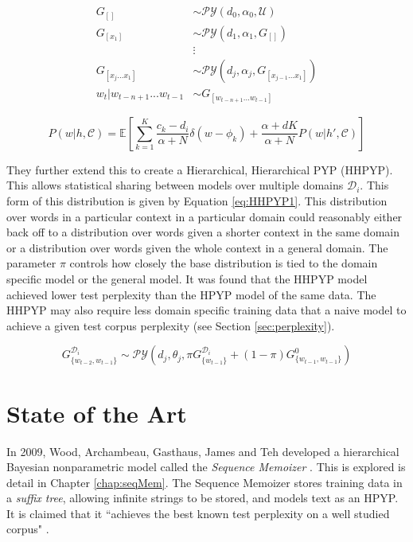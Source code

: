 \begin{align}
G_{[]}&\sim\mathcal{PY}(d_{0},\alpha_{0},\mathcal{U}) \nonumber
\\
G_{[x_{1}]}&\sim\mathcal{PY}(d_{1},\alpha_{1},G_{[]}) \nonumber
\\
&\vdots\nonumber 
\\
G_{[x_{j}...x_{1}]}&\sim\mathcal{PY}(d_{j},\alpha_{j},G_{[x_{j-1}...x_{1}]}) \nonumber
\\
w_{t}|w_{t-n+1}...w_{t-1}&\sim G_{[w_{t-n+1}...w_{t-1}]} 
\label{eq:HNBASLMDA1}
\end{align}


\begin{equation}
P(w|h,\mathcal{C})=\mathbb{E}\left[\sum_{k=1}^{K}\frac{c_{k}-d_{i}}{\alpha+N}\delta(w-\phi_{k})+\frac{\alpha+dK}{\alpha+N}P(w|h',\mathcal{C})\right]
\label{eq:HBNASLMDA2.1posterior}
\end{equation}

They further extend this to create a Hierarchical, Hierarchical PYP (HHPYP). This allows statistical sharing between models over multiple domains $\mathcal{D}_{i}$. This form of this distribution is given by Equation \ref{eq:HHPYP1}. This distribution over words in a particular context in a particular domain could reasonably either back off to a distribution over words given a shorter context in the same domain or a distribution over words given the whole context in a general domain. The parameter $\pi$ controls how closely the base distribution is tied to the domain specific model or the general model. It was found that the HHPYP model achieved lower test perplexity than the HPYP model of the same data. The HHPYP may also require less domain specific training data that a naive model to achieve a given test corpus perplexity (see Section \ref{sec:perplexity}).




\begin{equation}
G_{\{w_{t-2},w_{t-1}\}}^{\mathcal{D}_{i}}\sim\mathcal{PY}(d_{j},\theta_{j},\pi G_{\{w_{t-1}\}}^{\mathcal{D}_{i}}+(1-\pi)G_{\{w_{t-1},w_{t-1}\}}^{0})
\label{eq:HHPYP1}
\end{equation}


\section{State of the Art}

In 2009, Wood, Archambeau, Gasthaus, James and Teh developed a hierarchical Bayesian nonparametric model called the \textit{Sequence Memoizer} \cite{wood2009stochastic} \cite{wood2011sequence}. This is explored is detail in Chapter \ref{chap:seqMem}. The Sequence Memoizer stores training data in a \textit{suffix tree}, allowing infinite strings to be stored, and models text as an HPYP. It is claimed that it ``achieves the best known test perplexity on a well studied corpus" \cite{wood2009stochastic}.

